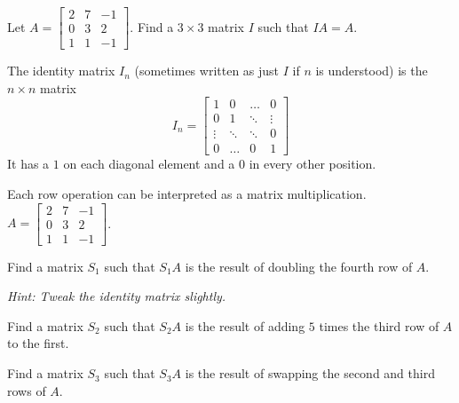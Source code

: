 
\begin{applicationActivities}{2}{22}

\begin{activity}{5}
Let $A=\begin{bmatrix} 2 & 7 & -1 \\ 0 & 3 & 2 \\ 1 & 1 & -1 \end{bmatrix}$.  Find a $3 \times 3$ matrix $I$ such that $IA=A$.
\end{activity}

\begin{definition}
The identity matrix $I_n$ (sometimes written as just $I$ if $n$ is understood) is  the $n \times n$ matrix $$I_n = \begin{bmatrix} 1 & 0  & \hdots & 0 \\ 0 & 1 & \ddots & \vdots  \\ \vdots & \ddots & \ddots & 0 \\ 0 & \hdots & 0 & 1 \end{bmatrix}$$
It has a $1$ on each diagonal element and a $0$ in every other position.
\end{definition}

\begin{activity}{15}
Each row operation can be interpreted as a matrix multiplication.  $A=\begin{bmatrix} 2 & 7 & -1 \\ 0 & 3 & 2 \\ 1 & 1 & -1 \end{bmatrix}$.


 \begin{subactivity}
 Find a matrix $S_1$ such that $S_1A$ is the result of doubling the fourth row of $A$.
 
 {\em Hint:  Tweak the identity matrix slightly.}
 \end{subactivity}
 \begin{subactivity}
 Find a matrix $S_2$ such that $S_2A$ is the result of adding $5$ times the third row of $A$ to the first.
 \end{subactivity}
\begin{subactivity}
 Find a matrix $S_3$ such that $S_3A$ is the result of swapping the second and third rows of $A$.
 \end{subactivity}


\end{activity}


\end{applicationActivities}
